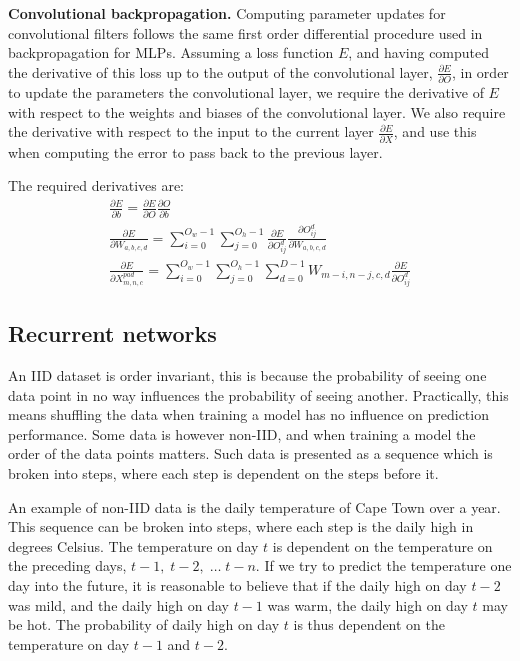 \noindent \textbf{Convolutional backpropagation.} Computing parameter updates for convolutional filters follows the same first order differential procedure used in backpropagation for MLPs. Assuming a loss function $ E $, and having computed the derivative of this loss up to the output of the convolutional layer, $ \frac{\partial E} {\partial O} $, in order to update the parameters the convolutional layer, we require the derivative of $ E $ with respect to the weights and biases of the convolutional layer. We also require the derivative with respect to the input to the current layer $\frac{\partial E} {\partial X}$, and use this when computing the error to pass back to the previous layer. \par

\noindent The required derivatives are:
\begin{subequations}
	\begin{gather}
		\frac{\partial E} {\partial b} = \frac{\partial E} {\partial O}\frac{\partial O} {\partial b} \\
		\frac{\partial E} {\partial W_{a,b,c,d}} = \sum_{i=0}^{O_w - 1}\sum_{j=0}^{O_h - 1}\frac{\partial E} {\partial O_{ij}^{d}}\frac{\partial O_{ij}^d} {\partial W_{a,b,c,d}} \\
		\frac{\partial E} {\partial X_{m,n,c}^{pad}} = \sum_{i=0}^{O_w - 1}\sum_{j=0}^{O_h - 1}\sum_{d=0}^{D - 1}W_{m-i,n-j,c,d}\frac{\partial E} {\partial O_{ij}^{d}}
	\end{gather}
\end{subequations}


\subsection{Recurrent networks}

An IID dataset is order invariant, this is because the probability of seeing one data point in no way influences the probability of seeing another. Practically, this means shuffling the data when training a model has no influence on prediction performance. Some data is however non-IID, and when training a model the order of the data points matters. Such data is presented as a sequence which is broken into steps, where each step is dependent on the steps before it. \par

\noindent An example of non-IID data is the daily temperature of Cape Town over a year. This sequence can be broken into steps, where each step is the daily high in degrees Celsius. The temperature on day $ t $ is dependent on the temperature on the preceding days, $ t - 1, \; t - 2, \; \dots \; t - n $. If we try to predict the temperature one day into the future, it is reasonable to believe that if the daily high on day $ t - 2 $ was mild, and the daily high on day $ t - 1 $ was warm, the daily high on day $ t $ may be hot. The probability of daily high on day $ t $ is thus dependent on the temperature on day $ t - 1$ and $ t - 2$. \par
 
